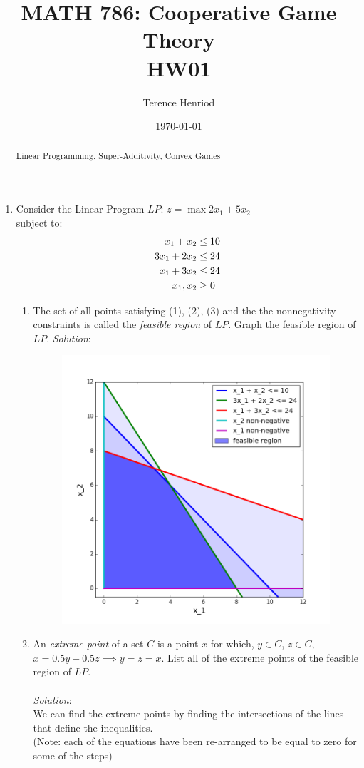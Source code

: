 \documentclass{article}
\title{MATH 786: Cooperative Game Theory \\ HW01}
\author{Terence Henriod}
\date{\today}
\begin{document}
\maketitle

\begin{abstract}
Linear Programming, Super-Additivity, Convex Games
\end{abstract}


\newpage
\begin{enumerate}
\item Consider the Linear Program $LP$: $z = \max 2x_{1} + 5x_{2}$ \\
    subject to:
    \begin{align}
     x_{1}  +   x_{2}  \le& \; 10 \\
    3x_{1}  +  2x_{2}  \le& \; 24 \\
     x_{1}  +  3x_{2}  \le& \; 24 \\
     x_{1}  ,   x_{2}  \ge& \;  0 \notag
    \end{align}

    \begin{enumerate}
    \item The set of all points satisfying (1), (2), (3) and the the nonnegativity constraints is called the \emph{feasible region} of $LP$. Graph the feasible region of $LP$.
    \textit{Solution}:
    \begin{figure}[h!]
      \centering
      \includegraphics[width=.5\linewidth]{01_a}
      \label{fig:01_a}
    \end{figure}

    \item An \emph{extreme point} of a set $C$ is a point $x$ for which, $y \in C$, $z \in C$, $x = 0.5y + 0.5z \implies y = z = x$. List all of the extreme points of the feasible region of $LP$. \\\\
    \textit{Solution}:\\
    We can find the extreme points by finding the intersections of the lines that define the inequalities.\\
    (Note: each of the equations have been re-arranged to be equal to zero for some of the steps)\\


\end{enumerate}
\end{enumerate}
\end{document}
